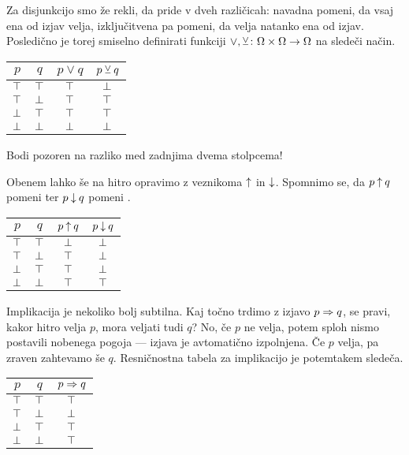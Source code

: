 		Za disjunkcijo smo že rekli, da pride v dveh različicah: navadna pomeni, da vsaj ena od izjav velja, izključitvena pa pomeni, da velja natanko ena od izjav. Posledično je torej smiselno definirati funkciji $\lor, \mathbin{\veebar}\colon \Omega \times \Omega \to \Omega$ na sledeči način.
		\begin{center}
			\begin{tabular}{cc|cc}
				$p$ & $q$ & $p \lor q$ & $p \mathbin{\veebar} q$ \\
				\hline
				$\top$ & $\top$ & $\top$ & $\bot$ \\
				$\top$ & $\bot$ & $\top$ & $\top$ \\
				$\bot$ & $\top$ & $\top$ & $\top$ \\
				$\bot$ & $\bot$ & $\bot$ & $\bot$
			\end{tabular}
		\end{center}
		Bodi pozoren na razliko med zadnjima dvema stolpcema!
		
		Obenem lahko še na hitro opravimo z veznikoma $\mathbin{\uparrow}$ in $\mathbin{\downarrow}$. Spomnimo se, da $p \mathbin{\uparrow} q$ pomeni  ter $p \mathbin{\downarrow} q$ pomeni .
		\begin{center}
			\begin{tabular}{cc|cc}
				$p$ & $q$ & $p \mathbin{\uparrow} q$ & $p \mathbin{\downarrow} q$ \\
				\hline
				$\top$ & $\top$ & $\bot$ & $\bot$ \\
				$\top$ & $\bot$ & $\top$ & $\bot$ \\
				$\bot$ & $\top$ & $\top$ & $\bot$ \\
				$\bot$ & $\bot$ & $\top$ & $\top$
			\end{tabular}
		\end{center}
		
		Implikacija je nekoliko bolj subtilna. Kaj točno trdimo z izjavo $p \Rightarrow q$, se pravi, kakor hitro velja $p$, mora veljati tudi $q$? No, če $p$ ne velja, potem sploh nismo postavili nobenega pogoja --- izjava je avtomatično izpolnjena. Če $p$ velja, pa zraven zahtevamo še $q$. Resničnostna tabela za implikacijo je potemtakem sledeča.
		\begin{center}
			\begin{tabular}{cc|c}
				$p$ & $q$ & $p \Rightarrow q$ \\
				\hline
				$\top$ & $\top$ & $\top$ \\
				$\top$ & $\bot$ & $\bot$ \\
				$\bot$ & $\top$ & $\top$ \\
				$\bot$ & $\bot$ & $\top$
			\end{tabular}
		\end{center}
		
